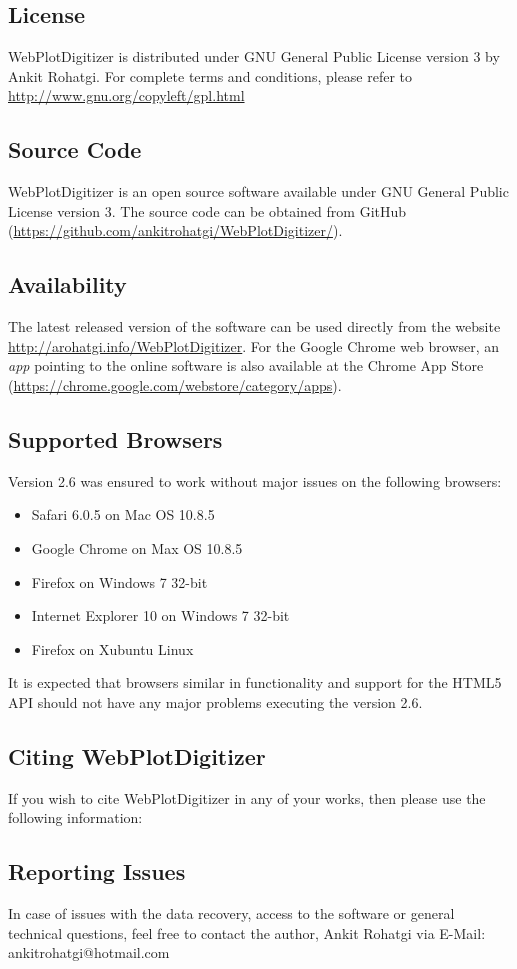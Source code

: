 \documentclass[letterpaper]{article}
\begin{document}
\subsection{License}
WebPlotDigitizer is distributed under GNU General Public License version 3 by Ankit Rohatgi. For complete terms and conditions, please refer to \url{http://www.gnu.org/copyleft/gpl.html}
\subsection{Source Code}
WebPlotDigitizer is an open source software available under GNU General Public License version 3. The source code can be obtained from GitHub (\url{https://github.com/ankitrohatgi/WebPlotDigitizer/}).
\subsection{Availability}
The latest released version of the software can be used directly from the website \url{http://arohatgi.info/WebPlotDigitizer}. For the Google Chrome web browser, an \emph{app} pointing to the online software is also available at the Chrome App Store (\url{https://chrome.google.com/webstore/category/apps}).

\subsection{Supported Browsers}
Version 2.6 was ensured to work without major issues on the following browsers:
\begin{itemize}
\item{Safari 6.0.5 on Mac OS 10.8.5}
\item{Google Chrome on Max OS 10.8.5}
\item{Firefox on Windows 7 32-bit}
\item{Internet Explorer 10 on Windows 7 32-bit}
\item{Firefox on Xubuntu Linux}
\end{itemize}
It is expected that browsers similar in functionality and support for the HTML5 API should not have any major problems executing the version 2.6.

\subsection{Citing WebPlotDigitizer}
If you wish to cite WebPlotDigitizer in any of your works, then please use the following information:

\subsection{Reporting Issues}
In case of issues with the data recovery, access to the software or general technical questions, feel free to contact the author, Ankit Rohatgi via E-Mail: ankitrohatgi@hotmail.com
\end{document}
